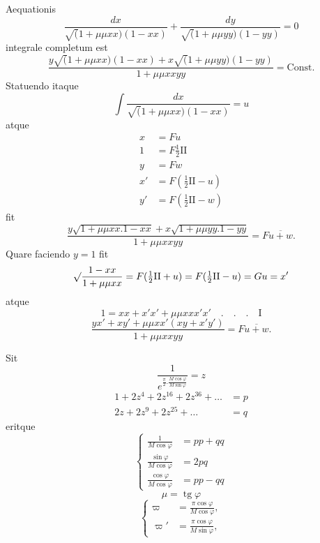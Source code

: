 \noindent [S.\ 33]
\par\indent Aequationis
\[\frac{dx}{\surd(1+\mu\mu xx)(1-xx)}+\frac{dy}{\surd(1+\mu\mu yy)(1-yy)}=0\]
\noindent integrale completum est
\[\frac{y\surd(1+\mu\mu xx)(1-xx)+x\surd(1+\mu\mu yy)(1-yy)}{1+\mu\mu xxyy}=\text{Const.}\]
\clearpage
{}
\noindent Statuendo itaque
\[\int\frac{dx}{\surd(1+\mu\mu xx)(1-xx)}=u\]
\noindent atque
\[\begin{aligned}
x&=Fu\\1&=F\tfrac12\mathrm{II}\\y&=Fw\\
x'&=F(\tfrac12\mathrm{II}-u)\\y'&=F(\tfrac12\mathrm{II}-w)
\end{aligned}\]
\noindent fit
\begin{equation*}\tag*{1)}
\frac{y\sqrt{1+\mu\mu xx.1-xx}+x\sqrt{1+\mu\mu yy.1-yy}}{1+\mu\mu xxyy}=F\overline{u+w}.
\end{equation*}
\noindent Quare faciendo \(y=1\) fit
\[\surd\frac{1-xx}{1+\mu\mu xx}=F(\tfrac12\mathrm{II}+u)=F(\tfrac12\mathrm{II}-u)=Gu=x'\]
\noindent atque
\[1=xx+x'x'+\mu\mu xx x'x'\quad.\quad.\quad.\quad\mathrm I\]
\[\frac{yx'+xy'+\mu\mu xx'(xy+x'y')}{1+\mu\mu xxyy}=F\overline{u+w}.\]
\noindent [S.\ 34]
\par\indent Sit
\begin{equation*}\tag*{[18]}
\frac1{e^{\frac\pi2.\frac{M\cos\varphi}{M\sin\varphi}}}=z
\end{equation*}
\begin{align*}
1+2z^4+2z^{16}+2z^{36}+\ldots&=p\tag*{[19]}\\
2z+2z^9+2z^{25}+\ldots&=q\tag*{[20]}
\end{align*}
\noindent eritque
\begin{equation*}\tag*{[21]}
\left\{\begin{aligned}
\frac1{M\cos\varphi}&=pp+qq\\
\frac{\sin\varphi}{M\cos\varphi}&=2pq\\
\frac{\cos\varphi}{M\cos\varphi}&=pp-qq
\end{aligned}\right.
\end{equation*}
\clearpage
{}
\[\mu=\operatorname{tg}\varphi\]
\begin{equation*}\tag*{[22]}
\left\{\begin{aligned}
\varpi&=\frac{\pi\cos\varphi}{M\cos\varphi},\\
\varpi'&=\frac{\pi\cos\varphi}{M\sin\varphi},
\end{aligned}\right.
\end{equation*}
